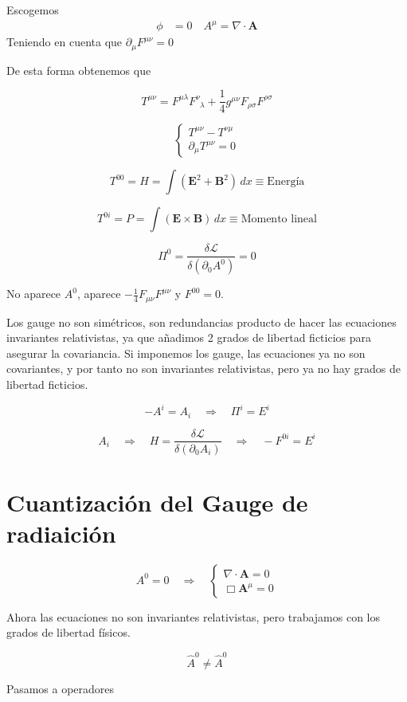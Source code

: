 Escogemos 
$$
\begin{align*}
    \phi &= 0 \quad A^\mu = \nabla \cdot \mathbf{A} 
\end{align*}
$$
Teniendo en cuenta que $ \partial_\mu F^{\mu\nu} = 0 $

De esta forma obtenemos que

$$
T^{\mu\nu} = F^{\mu\lambda} F^{\nu}_{\phantom{\nu}\lambda} + \frac{1}{4} g^{\mu\nu} F_{\rho\sigma} F^{\rho\sigma} 
$$

$$
\begin{cases}
T^{\mu\nu} - T^{\nu\mu} \\
\partial_\mu T^{\mu\nu} = 0
\end{cases}
$$

$$ 
T^{00} = H = \int (\mathbf{E}^2 + \mathbf{B}^2) \, dx \equiv \text{Energía}
$$

$$
T^{0i} = P = \int (\mathbf{E} \times \mathbf{B}) \, dx \equiv \text{Momento lineal}
$$

$$
\Pi^0 = \frac{\delta \mathcal{L}}{\delta(\partial_0 A^0)} = 0
$$

No aparece $ A^0 $, aparece $-\frac{1}{4} F_{\mu\nu} F^{\mu\nu}$ y $ F^{00} = 0 $.

Los gauge no son simétricos, son redundancias producto de hacer las ecuaciones invariantes relativistas, ya que añadimos 2 grados de libertad ficticios para asegurar la covariancia. Si imponemos los gauge, las ecuaciones ya no son covariantes, y por tanto no son invariantes relativistas, pero ya no hay grados de libertad ficticios.

$$
-A^i = A_i \quad \Rightarrow \quad \Pi^i = E^i
$$

$$
A_i \quad \Rightarrow \quad H = \frac{\delta \mathcal{L}}{\delta(\partial_0 A_i)} \quad \Rightarrow \quad -F^{0i} = E^i
$$
\section{Cuantización del Gauge de radiaición}
$$
A^0 = 0 \quad \Rightarrow \quad \begin{cases}
\nabla \cdot \mathbf{A} = 0 \\
\Box \mathbf{A}^\mu = 0
\end{cases}
$$

Ahora las ecuaciones no son invariantes relativistas, pero trabajamos con los grados de libertad físicos.

$$
\hat{A}^0 \neq \hat{A}^0
$$

Pasamos a operadores

